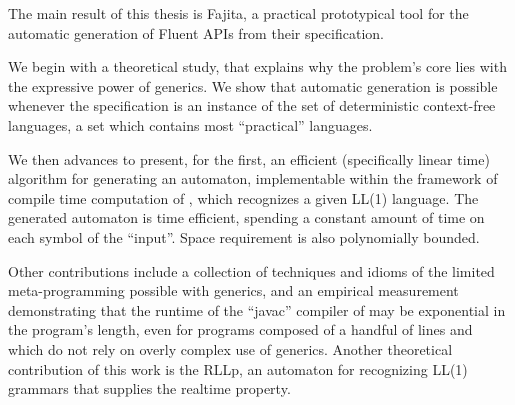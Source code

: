 The main result of this thesis is Fajita, a practical prototypical tool for the
automatic generation of  Fluent APIs from their
specification.

We begin with a theoretical study, that explains why the problem's core lies
with the expressive power of  generics.  We show that
automatic generation is possible whenever the specification is an instance of
the set of deterministic context-free languages, a set which contains most
``practical'' languages.

We then advances to present, for the first, an efficient (specifically linear
time) algorithm for generating an automaton, implementable within the framework
of compile time computation of , which recognizes
a given LL(1) language. The generated automaton is time efficient,
spending a constant amount of time on each symbol of the ``input''. Space
requirement is also polynomially bounded. 

Other contributions include a collection of techniques and idioms of the
limited meta-programming possible with  generics, and an
empirical measurement demonstrating that the runtime of the ``javac'' compiler
of  may be exponential in the program's length, even for
programs composed of a handful of lines and which do not rely on overly complex
use of generics. Another theoretical contribution of this work is the RLLp, an
automaton for recognizing LL(1) grammars that supplies the realtime property.
